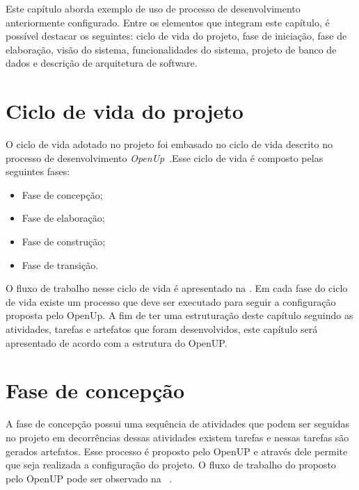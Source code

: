 Este capítulo aborda exemplo de uso de processo de desenvolvimento anteriormente configurado. Entre os elementos que integram este capítulo, é possível destacar os seguintes: ciclo de vida do projeto, fase de iniciação, fase de elaboração, visão do sistema, funcionalidades do sistema, projeto de banco de dados e descrição de arquitetura de software.

\section{Ciclo de vida do projeto}
O ciclo de vida adotado no projeto foi embasado no ciclo de vida descrito no processo de desenvolvimento  \emph{OpenUp}~\cite{openup}.Esse ciclo de vida é composto pelas seguintes fases:

\begin{itemize}
    \item Fase de concepção;
    \item Fase de elaboração;
    \item Fase de construção;
    \item Fase de transição.
\end{itemize}

%

O fluxo de trabalho nesse ciclo de vida é apresentado na . Em cada fase do ciclo de vida existe um processo que deve ser executado para seguir a configuração proposta pelo OpenUp. 
A fim de ter uma estruturação deste capítulo seguindo as atividades, tarefas e artefatos que foram desenvolvidos, este capítulo será apresentado de acordo com a estrutura do \acrfull{OpenUP}.

\section{Fase de concepção}

A fase de concepção possui uma sequência de atividades que podem ser seguidas no projeto em decorrências dessas atividades existem tarefas e nessas tarefas são gerados artefatos. Esse processo é proposto pelo \acrfull{OpenUP} e através dele permite que seja realizada a configuração do projeto. O fluxo de trabalho do proposto pelo \acrfull{OpenUP} pode ser observado na ~.

%

